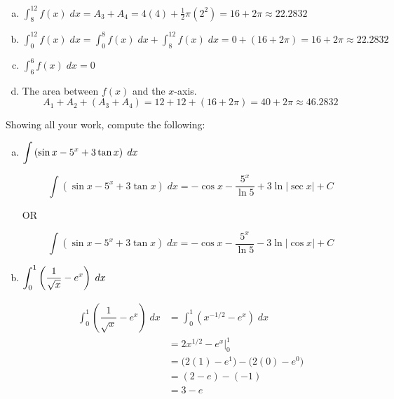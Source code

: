 \documentclass[12pt,letterpaper]{exam}
\begin{document}
\begin{questions}
\begin{enumerate}[(a)]
	\item $\displaystyle\int_8^{12} f(x) \;dx= A_3 + A_4= 4(4) + \frac{1}{2} \pi (2^2)= 16 + 2\pi \approx 22.2832$ \pspace\pspace\vfill
	
	\item $\displaystyle\int_0^{12} f(x) \;dx= \int_0^8 f(x) \;dx + \int_8^{12} f(x) \;dx= 0 + (16 + 2\pi)= 16 + 2\pi \approx 22.2832$ \pspace\pspace\vfill
	
	\item $\displaystyle\int_6^6 f(x) \;dx= 0$ \pspace\pspace\vfill
	
	\item The area between $f(x)$ and the $x$-axis. \pspace
		\[
		A_1 + A_2 + (A_3 + A_4)= 12 + 12 + (16 + 2\pi)= 40 + 2\pi \approx 46.2832
		\] \vfill
	\end{enumerate}



\newpage
\question[10] Showing all your work, compute the following: \par\vspace{0.3cm}
	\begin{enumerate}[(a)]
	\item $\displaystyle\int \left(\sin x - 5^x + 3 \tan x \right) \;dx$ \par\vspace{0.2cm}\vfill
		
		\[
		\int \left(\sin x - 5^x + 3 \tan x \right) \;dx= -\cos x - \dfrac{5^x}{\ln 5} + 3 \ln|\sec x| + C
		\] \pspace
		
		\begin{center} OR \end{center}
		
		\[
		\int \left(\sin x - 5^x + 3 \tan x \right) \;dx= -\cos x - \dfrac{5^x}{\ln 5} - 3 \ln|\cos x| + C
		\] \vfill
	
	\item $\displaystyle\int_0^1 \left( \dfrac{1}{\sqrt{x}} - e^x \right) \;dx$ \vfill
		
		\[
		\begin{aligned}
		\int_0^1 \left( \dfrac{1}{\sqrt{x}} - e^x \right) \;dx&= \int_0^1 \left( x^{-1/2} - e^x \right) \;dx \\[0.2cm]
		&= 2x^{1/2} - e^x \bigg|_0^1 \\[0.2cm]
		&= \big( 2(1) - e^1 \big) - \big( 2(0) - e^0 \big) \\[0.2cm]
		&= (2 - e) - (-1) \\[0.2cm]
		&= 3 - e
		\end{aligned}
		\] \vfill
	\end{enumerate}




\end{questions}
\end{document}
